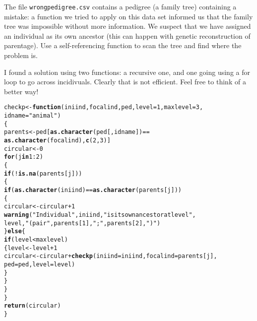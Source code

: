 \documentclass[12pt,a4paper]{scrartcl}\usepackage[]{graphicx}\usepackage[]{color}
\makeatletter
\newcommand{\hlnum}[1]{\textcolor[rgb]{0.686,0.059,0.569}{#1}}%
\newcommand{\hlstr}[1]{\textcolor[rgb]{0.192,0.494,0.8}{#1}}%
\newcommand{\hlopt}[1]{\textcolor[rgb]{0,0,0}{#1}}%
\newcommand{\hlstd}[1]{\textcolor[rgb]{0.345,0.345,0.345}{#1}}%
\newcommand{\hlkwa}[1]{\textcolor[rgb]{0.161,0.373,0.58}{\textbf{#1}}}%
\newcommand{\hlkwb}[1]{\textcolor[rgb]{0.69,0.353,0.396}{#1}}%
\newcommand{\hlkwc}[1]{\textcolor[rgb]{0.333,0.667,0.333}{#1}}%
\newcommand{\hlkwd}[1]{\textcolor[rgb]{0.737,0.353,0.396}{\textbf{#1}}}%
\newenvironment{kframe}{%
 \def\at@end@of@kframe{}%
 \ifinner\ifhmode%
  \def\at@end@of@kframe{\end{minipage}}%
  \begin{minipage}{\columnwidth}%
 \fi\fi%
 \def\FrameCommand##1{\hskip\@totalleftmargin \hskip-\fboxsep
 \colorbox{shadecolor}{##1}\hskip-\fboxsep
     \hskip-\linewidth \hskip-\@totalleftmargin \hskip\columnwidth}%
 \MakeFramed {\advance\hsize-\width
   \@totalleftmargin\z@ \linewidth\hsize
   \@setminipage}}%
 {\par\unskip\endMakeFramed%
 \at@end@of@kframe}
\newenvironment{knitrout}{}{} %
\makeatother
\begin{document}
\begin{Exercise}[difficulty=3, title={Find a mistake in a family tree}]
The file \texttt{wrongpedigree.csv} contains a pedigree (a family tree) containing a mistake: a function we tried to apply on this data set informed us that the family tree was impossible without more information. We suspect that we have assigned an individual as its own ancestor (this can happen with genetic reconstruction of parentage). Use a self-referencing function to scan the tree and find where the problem is.
\end{Exercise}
\begin{Answer}
I found a solution using two functions: a recursive one, and one going using a for loop to go across incidivuals. Clearly that is not efficient. Feel free to think of a better way!

\begin{knitrout}
\color{fgcolor}\begin{kframe}
\begin{alltt}
\hlstd{checkp} \hlkwb{<-} \hlkwa{function}\hlstd{(}\hlkwc{iniind}\hlstd{,} \hlkwc{focalind}\hlstd{,} \hlkwc{ped}\hlstd{,} \hlkwc{level}\hlstd{=}\hlnum{1}\hlstd{,} \hlkwc{maxlevel}\hlstd{=}\hlnum{3}\hlstd{,}
                   \hlkwc{idname} \hlstd{=} \hlstr{"animal"}\hlstd{)}
\hlstd{\{}
  \hlstd{parents} \hlkwb{<-} \hlstd{ped[}\hlkwd{as.character}\hlstd{(ped[,idname])}\hlopt{==}
                   \hlkwd{as.character}\hlstd{(focalind),}\hlkwd{c}\hlstd{(}\hlnum{2}\hlstd{,}\hlnum{3}\hlstd{)]}
  \hlstd{circular} \hlkwb{<-} \hlnum{0}
  \hlkwa{for}\hlstd{(j} \hlkwa{in} \hlnum{1}\hlopt{:}\hlnum{2}\hlstd{)}
  \hlstd{\{}
    \hlkwa{if}\hlstd{(}\hlopt{!}\hlkwd{is.na}\hlstd{(parents[j]))}
    \hlstd{\{}
      \hlkwa{if}\hlstd{(}\hlkwd{as.character}\hlstd{(iniind)}\hlopt{==}\hlkwd{as.character}\hlstd{(parents[j]))}
      \hlstd{\{}
        \hlstd{circular} \hlkwb{<-} \hlstd{circular}\hlopt{+}\hlnum{1}
        \hlkwd{warning}\hlstd{(}\hlstr{"Individual"}\hlstd{, iniind,} \hlstr{" is its own ancestor at level "}\hlstd{,}
                \hlstd{level,}  \hlstr{" (pair "}\hlstd{, parents[}\hlnum{1}\hlstd{],}\hlstr{";"}\hlstd{, parents[}\hlnum{2}\hlstd{],} \hlstr{")"}\hlstd{)}
      \hlstd{\}}\hlkwa{else}\hlstd{\{}
        \hlkwa{if}\hlstd{(level}\hlopt{<}\hlstd{maxlevel)}
        \hlstd{\{level} \hlkwb{<-} \hlstd{level}\hlopt{+}\hlnum{1}
        \hlstd{circular} \hlkwb{<-} \hlstd{circular} \hlopt{+} \hlkwd{checkp}\hlstd{(}\hlkwc{iniind}\hlstd{=iniind,} \hlkwc{focalind}\hlstd{=parents[j],}
                                      \hlkwc{ped} \hlstd{= ped,} \hlkwc{level}\hlstd{=level)}
        \hlstd{\}}
      \hlstd{\}}
    \hlstd{\}}
  \hlstd{\}}
  \hlkwd{return}\hlstd{(circular)}
\hlstd{\}}
\end{alltt}
\end{kframe}
\end{knitrout}


\end{Answer}
\end{document}
